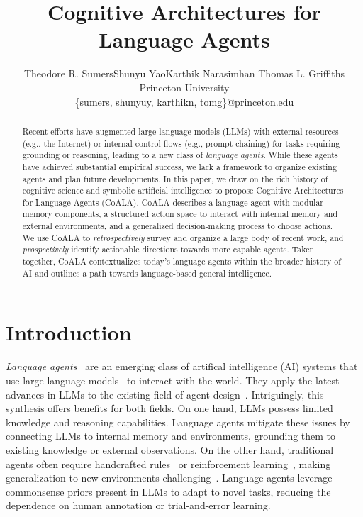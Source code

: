 \documentclass[10pt]{article} %
\title{Cognitive Architectures for Language Agents}
\author{\name Theodore R. Sumers\footnotemark[1] \quad Shunyu Yao\footnotemark[1] \quad Karthik Narasimhan \quad Thomas L. Griffiths \\
\addr Princeton University \\
\email \{sumers, shunyuy, karthikn, tomg\}@princeton.edu
}
\begin{document}
\maketitle
\renewcommand{\thefootnote}{\fnsymbol{footnote}}

\begin{abstract}
Recent efforts have augmented large language models (LLMs) with external resources (e.g., the Internet) or internal control flows (e.g., prompt chaining) for tasks requiring grounding or reasoning, leading to a new class of \emph{language agents}. While these agents have achieved substantial empirical success, we lack a framework to organize existing agents and plan future developments. 
In this paper, we draw on the rich history of cognitive science and symbolic artificial intelligence to propose Cognitive Architectures for Language Agents (CoALA). CoALA describes a language agent with modular memory components, a structured action space to interact with internal memory and external environments, and a generalized decision-making process to choose actions.
We use CoALA to \emph{retrospectively} survey and organize a large body of recent work, and \emph{prospectively} identify actionable directions towards more capable agents. 
Taken together, CoALA contextualizes today's language agents within the broader history of AI and outlines a path towards language-based general intelligence. 
\end{abstract}


\section{Introduction}

\emph{Language agents}~\citep{weng2023prompt, wang2023survey, xi2023rise, yao2023impact} are an emerging class of artifical intelligence (AI) systems that use large language models~\citep[LLMs;][]{vaswani2017attention, brown2020language, devlin2019bert,OpenAI2023GPT4TR} to interact with the world.
They apply the latest advances in LLMs to the existing field of agent design~\citep{russel2013artificial}.
Intriguingly, this synthesis offers benefits for both fields. On one hand, LLMs possess limited knowledge and reasoning capabilities. Language agents mitigate these issues by connecting LLMs to internal memory and environments, grounding them to existing knowledge or external observations.
On the other hand, traditional agents often require handcrafted rules~\citep{wilkins2014practical} or reinforcement learning~\citep{sutton2018reinforcement}, making generalization to new environments challenging~\citep{lake2016building}.
Language agents leverage commonsense priors present in LLMs to adapt to novel tasks, reducing the dependence on human annotation or trial-and-error learning.
\end{document}
